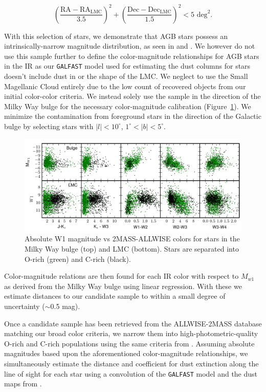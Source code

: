 $$\displaystyle\left(\frac{\text{RA} - \text{RA}_\text{LMC}}{3.5}\right)^2 + \left(\frac{\text{Dec} - \text{Dec}_\text{LMC}}{1.5} \right)^2 < 5 \text{ deg}^2.$$

\noindent With this selection of stars, we demonstrate that AGB stars possess an intrinsically-narrow magnitude distribution, as seen in \cite{1985A&A...152L...1H} and \cite{2002MNRAS.337..749J}. We however do not use this sample further to define the color-magnitude relationships for AGB stars in the IR as our {\tt GALFAST} model used for estimating the dust columns for stars doesn't include dust in or the shape of the LMC. We neglect to use the Small Magellanic Cloud entirely due to the low count of recovered objects from our initial color-color criteria.  We instead solely use the sample in the direction of the Milky Way bulge for the necessary color-magnitude calibration (Figure~\ref{fig:colormag}). We minimize the contamination from foreground stars in the direction of the Galactic bulge by selecting stars with $\lvert l\rvert < 10^\circ$, $1^\circ < \lvert b \rvert < 5^\circ$. 

\begin{figure}[h]
\includegraphics[width=6in]{figs/bulge_lmc_colormag.pdf}
\caption{Absolute W1 magnitude vs 2MASS-ALLWISE colors for stars in the Milky Way bulge (top) and LMC (bottom). Stars are separated into O-rich (green) and C-rich (black).}
\label{fig:colormag}
\end{figure}

Color-magnitude relations are then found for each IR color with respect to $M_{w1}$ as derived from the Milky Way bulge using linear regression. With these we estimate distances to our candidate sample to within a small degree of uncertainty ($\sim$0.5 mag).

Once a candidate sample has been retrieved from the ALLWISE-2MASS database matching our broad color criteria, we narrow them into high-photometric-quality O-rich and C-rich populations using the same criteria from \cite{2014MNRAS.442.3361N}. Assuming absolute magnitudes based upon the aforementioned color-magnitude relationships, we simultaneously estimate the distance and coefficient for dust extinction along the line of sight for each star using a convolution of the {\tt GALFAST} model and the dust maps from \cite{1998ApJ...500..525S}.

